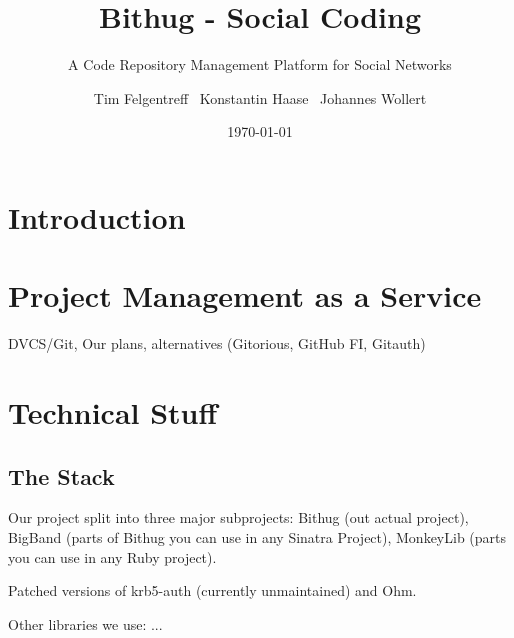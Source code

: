 \documentclass{llncs}
\begin{document}
\pagestyle{headings}  %
\mainmatter %
\title{Bithug - Social Coding}
\subtitle{A Code Repository Management Platform for Social Networks}
\author{Tim Felgentreff~ Konstantin Haase~ Johannes Wollert}
\date{\today}

\maketitle
\begin{abstract}

\end{abstract}
\section{Introduction}

\section{Project Management as a Service}
DVCS/Git, Our plans, alternatives (Gitorious, GitHub FI, Gitauth)

\section{Technical Stuff}

\subsection{The Stack}
Our project split into three major subprojects: Bithug (out actual project), BigBand (parts of Bithug you can use in any Sinatra Project), MonkeyLib (parts you can use in any Ruby project).

Patched versions of krb5-auth (currently unmaintained) and Ohm.

Other libraries we use: ...
\end{document}
